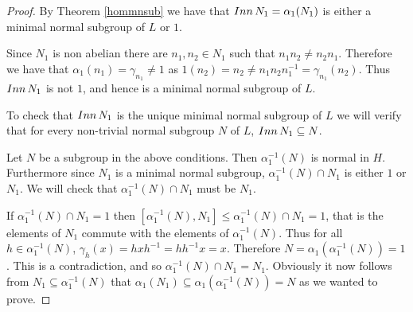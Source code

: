\begin{proof}
    By Theorem \ref{hommnsub} we have that $Inn\, {N}_1 = \alpha_1(N_1)$ is either a minimal normal subgroup of $L$ or $1$. 
    
    Since $N_1$ is non abelian there are $n_1, n_2 \in N_1$ such that $n_1n_2 \neq n_2n_1$. Therefore we have that $\alpha_1(n_1) = \gamma_{n_1} \neq 1$ as $1(n_2) = n_2 \neq n_1n_2n_1^{-1} = \gamma_{n_1}(n_2)$. Thus $Inn\, {N}_1$ is not $1$, and hence is a minimal normal subgroup of $L$.

    To check that $Inn\, {N}_1$ is the unique minimal normal subgroup of $L$ we will verify that for every non-trivial normal subgroup $N$ of $L$, $Inn\, {N}_1 \subseteq N$. 
    
    Let $N$ be a subgroup in the above conditions. Then $\alpha_1^{-1}(N)$ is normal in $H$. Furthermore since $N_1$ is a minimal normal subgroup, $\alpha_1^{-1}(N) \cap N_1$ is either $1$ or $N_1$. We will check that $\alpha_1^{-1}(N) \cap N_1$ must be $N_1$.

    If $\alpha_1^{-1}(N) \cap N_1 = 1$ then $[\alpha_1^{-1}(N), N_1] \le \alpha_1^{-1}(N) \cap N_1 = 1$, that is the elements of $N_1$ commute with the elements of $\alpha_1^{-1}(N)$. Thus for all $h \in \alpha_1^{-1}(N)$, $\gamma_h(x) = hxh^{-1} = hh^{-1}x = x$. Therefore $N = \alpha_1(\alpha_1^{-1}(N)) = 1$. This is a contradiction, and so $\alpha_1^{-1}(N) \cap N_1 = N_1$.
    Obviously it now follows from $N_1 \subseteq \alpha_1^{-1}(N)$ that $\alpha_1(N_1) \subseteq \alpha_1(\alpha_1^{-1}(N)) = N$ as we wanted to prove.
\end{proof}

